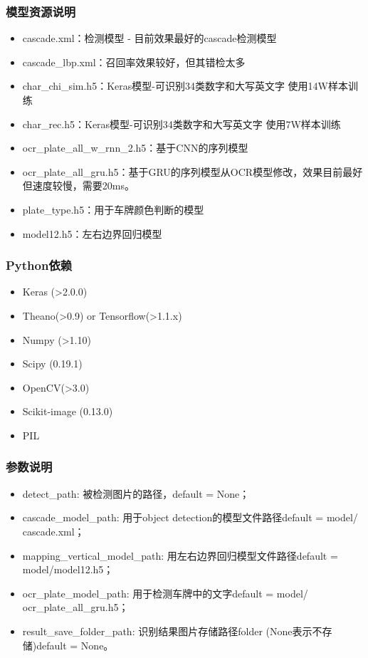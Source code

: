 \subsubsection{模型资源说明}
\begin{itemize}
	\item cascade.xml：检测模型 - 目前效果最好的cascade检测模型
	\item cascade\_lbp.xml：召回率效果较好，但其错检太多
	\item char\_chi\_sim.h5：Keras模型-可识别34类数字和大写英文字 使用14W样本训练
	\item char\_rec.h5：Keras模型-可识别34类数字和大写英文字 使用7W样本训练
	\item ocr\_plate\_all\_w\_rnn\_2.h5：基于CNN的序列模型
	\item ocr\_plate\_all\_gru.h5：基于GRU的序列模型从OCR模型修改，效果目前最好但速度较慢，需要20ms。
	\item plate\_type.h5：用于车牌颜色判断的模型
	\item model12.h5：左右边界回归模型
\end{itemize}

\subsubsection{Python依赖}
\begin{itemize}
	\item Keras (>2.0.0)
	\item Theano(>0.9) or Tensorflow(>1.1.x)
	\item Numpy (>1.10)
	\item Scipy (0.19.1)
	\item OpenCV(>3.0)
	\item Scikit-image (0.13.0)
	\item PIL
\end{itemize}

\subsubsection{参数说明}
\begin{itemize}
	\item detect\_path: 被检测图片的路径，default = None；
	\item cascade\_model\_path: 用于object detection的模型文件路径default = model/ cascade.xml；
	\item mapping\_vertical\_model\_path: 用左右边界回归模型文件路径default = model/model12.h5；
	\item ocr\_plate\_model\_path: 用于检测车牌中的文字default = model/ ocr\_plate\_all\_gru.h5；
	\item result\_save\_folder\_path: 识别结果图片存储路径folder (None表示不存储)default = None。
\end{itemize}


